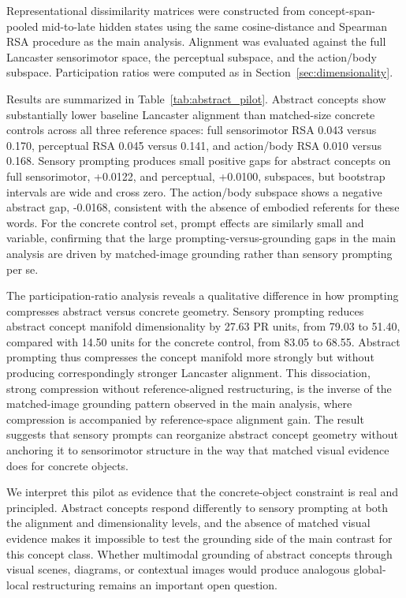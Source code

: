 \documentclass{article}
\begin{document}
Representational dissimilarity matrices were constructed from concept-span-pooled mid-to-late hidden states using the same cosine-distance and Spearman RSA procedure as the main analysis. Alignment was evaluated against the full Lancaster sensorimotor space, the perceptual subspace, and the action/body subspace. Participation ratios were computed as in Section~\ref{sec:dimensionality}.

Results are summarized in Table~\ref{tab:abstract_pilot}. Abstract concepts show substantially lower baseline Lancaster alignment than matched-size concrete controls across all three reference spaces: full sensorimotor RSA 0.043 versus 0.170, perceptual RSA 0.045 versus 0.141, and action/body RSA 0.010 versus 0.168. Sensory prompting produces small positive gaps for abstract concepts on full sensorimotor, +0.0122, and perceptual, +0.0100, subspaces, but bootstrap intervals are wide and cross zero. The action/body subspace shows a negative abstract gap, -0.0168, consistent with the absence of embodied referents for these words. For the concrete control set, prompt effects are similarly small and variable, confirming that the large prompting-versus-grounding gaps in the main analysis are driven by matched-image grounding rather than sensory prompting per se.

The participation-ratio analysis reveals a qualitative difference in how prompting compresses abstract versus concrete geometry. Sensory prompting reduces abstract concept manifold dimensionality by 27.63 PR units, from 79.03 to 51.40, compared with 14.50 units for the concrete control, from 83.05 to 68.55. Abstract prompting thus compresses the concept manifold more strongly but without producing correspondingly stronger Lancaster alignment. This dissociation, strong compression without reference-aligned restructuring, is the inverse of the matched-image grounding pattern observed in the main analysis, where compression is accompanied by reference-space alignment gain. The result suggests that sensory prompts can reorganize abstract concept geometry without anchoring it to sensorimotor structure in the way that matched visual evidence does for concrete objects.

We interpret this pilot as evidence that the concrete-object constraint is real and principled. Abstract concepts respond differently to sensory prompting at both the alignment and dimensionality levels, and the absence of matched visual evidence makes it impossible to test the grounding side of the main contrast for this concept class. Whether multimodal grounding of abstract concepts through visual scenes, diagrams, or contextual images would produce analogous global-local restructuring remains an important open question.
\end{document}
